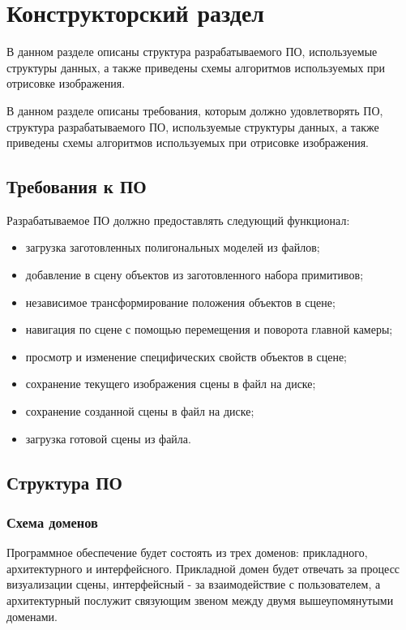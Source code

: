 \chapter{Конструкторский раздел}

В данном разделе описаны структура разрабатываемого ПО, используемые структуры данных, а также приведены схемы алгоритмов используемых при отрисовке изображения.

В данном разделе описаны требования, которым должно удовлетворять ПО, структура разрабатываемого ПО, используемые структуры данных, а также приведены схемы алгоритмов используемых при отрисовке изображения.

\section{Требования к ПО}

Разрабатываемое ПО должно предоставлять следующий функционал:

\begin{itemize}
	\item загрузка заготовленных полигональных моделей из файлов;
	\item добавление в сцену объектов из заготовленного набора примитивов;
	\item независимое трансформирование положения объектов в сцене;
	\item навигация по сцене с помощью перемещения и поворота главной камеры;
	\item просмотр и изменение специфических свойств объектов в сцене;
	\item сохранение текущего изображения сцены в файл на диске;
	\item сохранение созданной сцены в файл на диске;
	\item загрузка готовой сцены из файла.
\end{itemize}

\clearpage

\section{Структура ПО}

\subsection{Схема доменов}

Программное обеспечение будет состоять из трех доменов: прикладного, архитектурного и
интерфейсного. Прикладной домен будет отвечать за процесс визуализации сцены,
интерфейсный - за взаимодействие с пользователем, а архитектурный послужит связующим звеном между двумя вышеупомянутыми доменами.

